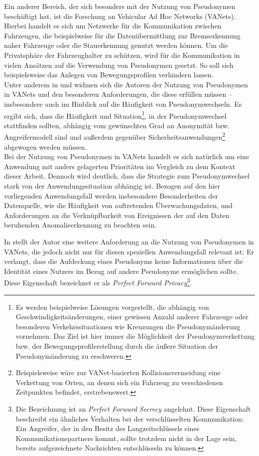 Ein anderer Bereich, der sich besonders mit der Nutzung von Pseudonymen beschäftigt hat, ist die Forschung an Vehicular Ad Hoc Networks (VANets). Hierbei handelt es sich um Netzwerke für die Kommunikation zwischen Fahrzeugen, die beispielweise für die Datenübermittlung zur Bremserkennung naher Fahrzeuge oder die Stauerkennung genutzt werden können. Um die Privatsphäre der Fahrzeughalter zu schützen, wird für die Kommunikation in vielen Ansätzen auf die Verwendung von Pseudonymen gesetzt. So soll sich beispielsweise das Anlegen von Bewegungsprofilen verhindern lassen.\\
Unter anderem in \cite{dotzer2005} und \cite{petit2015} widmen sich die Autoren der Nutzung von Pseudonymen in VANets und den besonderen Anforderungen, die diese erfüllen müssen -- insbesondere auch im Hinblick auf die Häufigkeit von Pseudonymwechseln. Es ergibt sich, dass die Häufigkeit und Situation\footnote{
  Es werden beispielweise Lösungen vorgestellt, die abhängig von Geschwindigkeitsänderungen, einer gewissen Anzahl anderer Fahrzeuge oder besonderen Verkehrssituationen wie Kreuzungen die Pseudonymänderung vornehmen. Das Ziel ist hier immer die Möglichkeit der Pseudonymverkettung bzw. der Bewegungsprofilerstellung durch die äußere Situation der Pseudonymänderung zu erschweren.
}, in der Pseudonymwechsel stattfinden sollten, abhängig vom gewünschten Grad an Anonymität bzw. Angreifermodell sind und außerdem gegenüber Sicherheitsanwendungen\footnote{
  Beispielsweise wäre zur VANet-basierten Kollisionsvermeidung eine Verkettung von Orten, an denen sich ein Fahrzeug zu verschiedenen Zeitpunkten befindet, erstrebenswert.
}  abgewogen werden müssen.\\
Bei der Nutzung von Pseudonymen in VANets handelt es sich natürlich um eine Anwendung mit anders gelagerten Prioritäten im Vergleich zu dem Kontext dieser Arbeit. Dennoch wird deutlich, dass die Strategie zum Pseudonymwechsel stark von der Anwendungssituation abhängig ist. Bezogen auf den hier vorliegenden Anwendungsfall werden insbesondere Besonderheiten der Datenquelle, wie die Häufigkeit von auftretenden Überwachungsdaten, und Anforderungen an die Verknüpfbarkeit von Ereignissen der auf den Daten beruhenden Anomalieerkennung zu beachten sein.


In \cite{schaub2009} stellt der Autor eine weitere Anforderung an die Nutzung von Pseudonymen in VANets, die jedoch nicht nur für diesen speziellen Anwendungsfall relevant ist: Er verlangt, dass die Aufdeckung eines Pseudonyms keine Informationen über die Identität eines Nutzers im Bezug auf andere Pseudonyme ermöglichen sollte. Diese Eigenschaft bezeichnet er als \textit{Perfect Forward Privacy}\footnote{
  Die Bezeichnung ist an \textit{Perfect Forward Secrecy} angelehnt. Diese Eigenschaft beschreibt ein ähnliches Verhalten bei der verschlüsselten Kommunikation: Ein Angreifer, der in den Besitz des Langzeitschlüssels eines Kommunikationspartners kommt, sollte trotzdem nicht in der Lage sein, bereits aufgezeichnete Nachrichten entschlüsseln zu können.
}.

